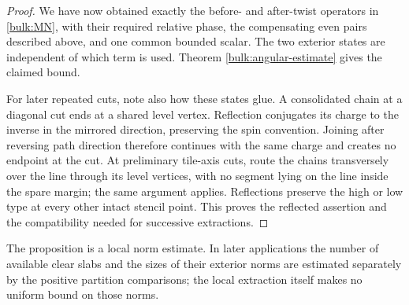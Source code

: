 \begin{proof}
We have now obtained exactly the before- and after-twist
operators in \eqref{bulk:MN}, with their required relative
phase, the compensating even pairs described above, and
one common bounded scalar. The two exterior states are
independent of which term is used. Theorem
\ref{bulk:angular-estimate} gives the claimed bound.

For later repeated cuts, note also how these states glue.
A consolidated chain at a diagonal cut ends at a shared
level vertex. Reflection conjugates its charge to the
inverse in the mirrored direction, preserving the spin
convention. Joining after reversing path direction therefore
continues with the same charge and creates no endpoint at
the cut. At preliminary tile-axis cuts, route the chains
transversely over the line through its level vertices, with
no segment lying on the line inside the spare margin; the
same argument applies. Reflections preserve the high or
low type at every other intact stencil point. This proves
the reflected assertion and the compatibility needed for
successive extractions.
\end{proof}

The proposition is a local norm estimate. In later applications
the number of available clear slabs and the sizes of their
exterior norms are estimated separately by the positive
partition comparisons; the local extraction itself makes no
uniform bound on those norms.
